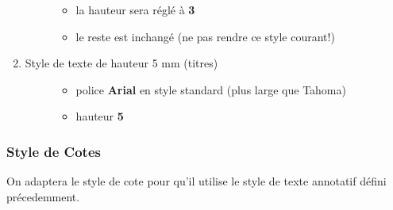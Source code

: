 \documentclass[a4paper,12pt,french]{sphinxmanual}
\begin{document}
\begin{enumerate}
\begin{description}
\begin{itemize}
\item {} 
la hauteur sera réglé à \textbf{3}

\item {} 
le reste est inchangé (ne pas rendre ce style courant!)

\end{itemize}

\end{description}

\item {} \begin{description}
\item[{Style de texte de hauteur 5 mm (titres)}] \leavevmode\begin{itemize}
\item {} 
police \textbf{Arial} en style standard (plus large que Tahoma)

\item {} 
hauteur \textbf{5}

\end{itemize}

\end{description}

\end{enumerate}


\subsubsection{Style de Cotes}
\label{acad/config_acad:style-de-cotes}
On adaptera le style de cote pour qu'il utilise le style de texte annotatif défini précedemment.
\end{document}
